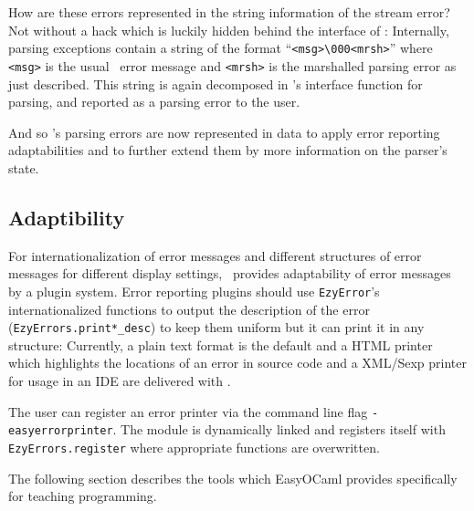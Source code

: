 How are these errors represented in the string information of the stream error?
Not without a hack which is luckily hidden behind the interface of \camlpf:
Internally, parsing exceptions contain a string of the format
``\texttt{<msg>\textbackslash 000<mrsh>}'' where \texttt{<msg>} is
the usual \camlpf\ error message and \texttt{<mrsh>} is the marshalled parsing
error as just described.
This string is again decomposed in \camlpf's interface function for
parsing, and reported as
a parsing error to the user.

And so \camlpf's parsing errors are now represented in data to apply error
reporting adaptabilities and to further extend them by more information on the
parser's state.

\subsection{Adaptibility}

For internationalization of error messages and different structures of error
messages for different display settings, \easyocaml\ provides adaptability of
error messages by a plugin system.  Error reporting plugins should use
\texttt{EzyError}'s internationalized functions to output the description of
the error (\texttt{EzyErrors.print*\_desc}) to keep them uniform but it can
print it in any structure:  Currently, a plain text format is the default and a
HTML printer which highlights the locations of an error in source code and a
XML/Sexp printer for usage in an IDE are delivered with \easyocaml.

The user can register an error printer via the command line flag 
\texttt{-easyerrorprinter}.  The module is dynamically linked and 
registers itself with \texttt{EzyErrors.register} where appropriate 
functions are overwritten.

The following section describes the tools which EasyOCaml provides 
specifically for teaching programming.
